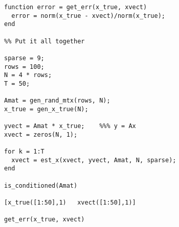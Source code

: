 \documentclass[11pt]{article}
\begin{document}
\begin{verbatim}
function error = get_err(x_true, xvect)
  error = norm(x_true - xvect)/norm(x_true);
end

%% Put it all together

sparse = 9;
rows = 100;
N = 4 * rows;
T = 50;

Amat = gen_rand_mtx(rows, N);
x_true = gen_x_true(N);

yvect = Amat * x_true;    %%% y = Ax
xvect = zeros(N, 1);

for k = 1:T
  xvect = est_x(xvect, yvect, Amat, N, sparse);
end

is_conditioned(Amat)

[x_true([1:50],1)   xvect([1:50],1)]

get_err(x_true, xvect)
\end{verbatim}
\end{document}

